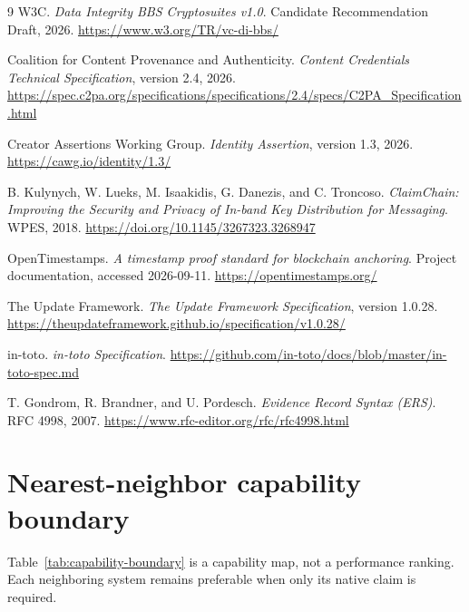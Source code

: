 \documentclass[conference,compsoc]{IEEEtran}
\begin{document}
\begin{thebibliography}{9}
W3C. \emph{Data Integrity BBS Cryptosuites v1.0}. Candidate Recommendation Draft, 2026. \url{https://www.w3.org/TR/vc-di-bbs/}

Coalition for Content Provenance and Authenticity. \emph{Content Credentials
Technical Specification}, version 2.4, 2026.
\url{https://spec.c2pa.org/specifications/specifications/2.4/specs/C2PA_Specification.html}

Creator Assertions Working Group. \emph{Identity Assertion}, version 1.3,
2026. \url{https://cawg.io/identity/1.3/}

B. Kulynych, W. Lueks, M. Isaakidis, G. Danezis, and C. Troncoso.
\emph{ClaimChain: Improving the Security and Privacy of In-band Key
Distribution for Messaging}. WPES, 2018.
\url{https://doi.org/10.1145/3267323.3268947}

OpenTimestamps. \emph{A timestamp proof standard for blockchain anchoring}.
Project documentation, accessed 2026-09-11. \url{https://opentimestamps.org/}

The Update Framework. \emph{The Update Framework Specification}, version 1.0.28. \url{https://theupdateframework.github.io/specification/v1.0.28/}

in-toto. \emph{in-toto Specification}. \url{https://github.com/in-toto/docs/blob/master/in-toto-spec.md}

T. Gondrom, R. Brandner, and U. Pordesch. \emph{Evidence Record Syntax
(ERS)}. RFC 4998, 2007. \url{https://www.rfc-editor.org/rfc/rfc4998.html}
\end{thebibliography}

\ifdefined\ACSDACSAC
  \appendices
\else
  \appendix
\fi
\section{Nearest-neighbor capability boundary}
\label{app:capability-boundary}

Table~\ref{tab:capability-boundary} is a capability map, not a performance
ranking. Each neighboring system remains preferable when only its native
claim is required.
\end{document}
